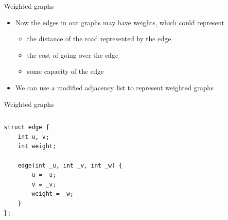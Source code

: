\documentclass{beamer}
\begin{document}
\begin{frame}[plain]{Weighted graphs}
    \begin{itemize}
        \item Now the edges in our graphs may have weights, which could represent
            \begin{itemize}
                \item the distance of the road represented by the edge
                \item the cost of going over the edge
                \item some capacity of the edge
            \end{itemize}

        \item We can use a modified adjacency list to represent weighted graphs
    \end{itemize}
\end{frame}

\begin{frame}{Weighted graphs}
    \begin{columns}[T]
        \begin{column}{.4\textwidth}
            \begin{verbatim}
struct edge {
    int u, v;
    int weight;

    edge(int _u, int _v, int _w) {
        u = _u;
        v = _v;
        weight = _w;
    }
};
            \end{verbatim}
        \end{column}%
        \hfill%
        \begin{column}{.6\textwidth}
            \begin{figure}
            \end{figure}
        \end{column}%
    \end{columns}
\end{frame}
\end{document}
